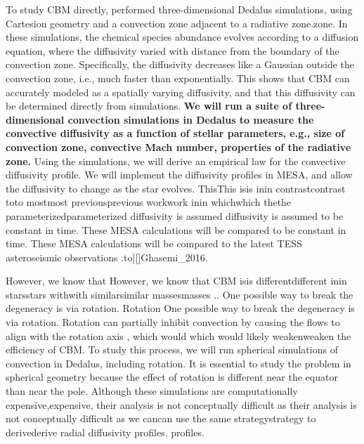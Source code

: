 To study CBM directly, \citet{Lecoanet_2016a} performed three-dimensional Dedalus simulations, using Cartesion geometry and a convection zone adjacent to a radiative zone.zone. In these simulations, the chemical species abundance evolves according to a diffusion equation, where the diffusivity varied with distance from the boundary of the convection zone. Specifically, the diffusivity decreases like a Gaussian outside the convection zone, i.e., much faster than exponentially. This shows that CBM can accurately modeled as a spatially varying diffusivity, and that this diffusivity can be determined directly from simulations. \textbf{We will run a suite of three-dimensional convection simulations in Dedalus to measure the convective diffusivity as a function of stellar parameters, e.g., size of convection zone, convective Mach number, properties of the radiative zone.} Using the simulations, we will derive an empirical law for the convective diffusivity profile. We will implement the diffusivity profiles in MESA, and allow the diffusivity to change as the star evolves. ThisThis isis inin contrastcontrast toto mostmost previousprevious workwork inin whichwhich thethe parameterizedparameterized diffusivity is assumed diffusivity is assumed to be constant in time. These MESA calculations will be compared to be constant in time. These MESA calculations will be compared to the latest TESS asteroseismic observations \citep[similar to][]{Ghasemi_2016}.to][]{Ghasemi_2016}.

However, we know that However, we know that CBM isis differentdifferent inin starsstars withwith similarsimilar massesmasses \citep{Stancliffe_2015}.\citep{Stancliffe_2015}. One possible way to break the degeneracy is via rotation. Rotation One possible way to break the degeneracy is via rotation. Rotation can partially inhibit convection by causing the flows to align with the rotation axis \cite[e.g.,][]{Featherstone_2016}, which would which would likely weakenweaken the efficiency of CBM. To study this process, we will run spherical simulations of convection in Dedalus, including rotation. It is essential to study the problem in spherical geometry because the effect of rotation is different near the equator than near the pole. Although these simulations are computationally expensive,expensive, their analysis is not conceptually difficult as their analysis is not conceptually difficult as we cancan use the same strategystrategy to derivederive radial diffusivity profiles.
profiles.
